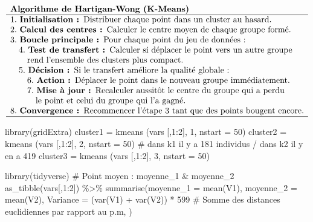 \documentclass[
  french,
  letterpaper,
  DIV=11,
  numbers=noendperiod]{scrartcl}
\newenvironment{Shaded}{\begin{snugshade}}{\end{snugshade}}
\newcommand{\AttributeTok}[1]{\textcolor[rgb]{0.40,0.45,0.13}{#1}}
\newcommand{\CommentTok}[1]{\textcolor[rgb]{0.37,0.37,0.37}{#1}}
\newcommand{\DecValTok}[1]{\textcolor[rgb]{0.68,0.00,0.00}{#1}}
\newcommand{\FunctionTok}[1]{\textcolor[rgb]{0.28,0.35,0.67}{#1}}
\newcommand{\NormalTok}[1]{\textcolor[rgb]{0.00,0.23,0.31}{#1}}
\newcommand{\OtherTok}[1]{\textcolor[rgb]{0.00,0.23,0.31}{#1}}
\newcommand{\SpecialCharTok}[1]{\textcolor[rgb]{0.37,0.37,0.37}{#1}}
\begin{document}
\[
\begin{array}{l}
\textbf{Algorithme de Hartigan-Wong (K-Means)} \\
\hline
1.\ \textbf{Initialisation : } \text{Distribuer chaque point dans un cluster au hasard.} \\
2.\ \textbf{Calcul des centres : } \text{Calculer le centre moyen de chaque groupe formé.} \\
3.\ \textbf{Boucle principale : } \text{Pour chaque point du jeu de données :} \\
\quad 4.\ \textbf{Test de transfert : } \text{Calculer si déplacer le point vers un autre groupe} \\
\quad \quad \text{rend l'ensemble des clusters plus compact.} \\
\quad 5.\ \textbf{Décision : } \text{Si le transfert améliore la qualité globale :} \\
\quad \quad 6.\ \textbf{Action : } \text{Déplacer le point dans le nouveau groupe immédiatement.} \\
\quad \quad 7.\ \textbf{Mise à jour : } \text{Recalculer aussitôt le centre du groupe qui a perdu} \\
\quad \quad \quad \text{le point et celui du groupe qui l'a gagné.} \\
8.\ \textbf{Convergence : } \text{Recommencer l'étape 3 tant que des points bougent encore.} \\
\hline
\end{array}
\]

\begin{Shaded}
\begin{Highlighting}[]
\FunctionTok{library}\NormalTok{(gridExtra)}
\NormalTok{cluster1 }\OtherTok{=} \FunctionTok{kmeans}\NormalTok{ (vars [,}\DecValTok{1}\SpecialCharTok{:}\DecValTok{2}\NormalTok{], }\DecValTok{1}\NormalTok{, }\AttributeTok{nstart =} \DecValTok{50}\NormalTok{) }
\NormalTok{cluster2 }\OtherTok{=} \FunctionTok{kmeans}\NormalTok{ (vars [,}\DecValTok{1}\SpecialCharTok{:}\DecValTok{2}\NormalTok{], }\DecValTok{2}\NormalTok{, }\AttributeTok{nstart =} \DecValTok{50}\NormalTok{) }\CommentTok{\# dans k1 il y a 181 individus / dans k2 il y en a 419}
\NormalTok{cluster3 }\OtherTok{=} \FunctionTok{kmeans}\NormalTok{ (vars [,}\DecValTok{1}\SpecialCharTok{:}\DecValTok{2}\NormalTok{], }\DecValTok{3}\NormalTok{, }\AttributeTok{nstart =} \DecValTok{50}\NormalTok{)}

\FunctionTok{library}\NormalTok{(tidyverse)}
\CommentTok{\# Point moyen : moyenne\_1 \& moyenne\_2}
\FunctionTok{as\_tibble}\NormalTok{(vars[,}\DecValTok{1}\SpecialCharTok{:}\DecValTok{2}\NormalTok{]) }\SpecialCharTok{\%\textgreater{}\%} \FunctionTok{summarise}\NormalTok{(}\AttributeTok{moyenne\_1 =} \FunctionTok{mean}\NormalTok{(V1),}
                         \AttributeTok{moyenne\_2 =} \FunctionTok{mean}\NormalTok{(V2),}
                         \AttributeTok{Variance =}\NormalTok{ (}\FunctionTok{var}\NormalTok{(V1) }\SpecialCharTok{+} \FunctionTok{var}\NormalTok{(V2)) }\SpecialCharTok{*} \DecValTok{599} \CommentTok{\# Somme des distances euclidiennes par rapport au p.m,}
\NormalTok{                         ) }
\end{Highlighting}
\end{Shaded}
\end{document}
